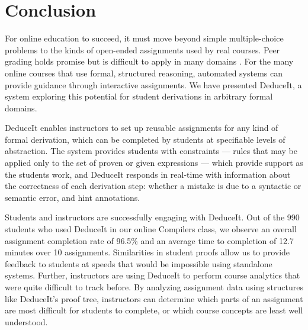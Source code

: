\documentclass{sigchi}
\begin{document}








\section{Conclusion}

For online education to succeed, it must move beyond simple multiple-choice problems to the kinds of open-ended assignments used by real courses. Peer grading holds promise but is difficult to apply in many domains \cite{peer-consistency}. For the many online courses that use formal, structured reasoning, automated systems can provide guidance through interactive assignments. We have presented DeduceIt, a system exploring this potential for student derivations in arbitrary formal domains. 

DeduceIt enables instructors to set up reusable assignments for any kind of formal derivation, which can be completed by students at specifiable levels of abstraction. The system provides students with constraints --- rules that may be applied only to the set of proven or given expressions --- which provide support as the students work, and DeduceIt responds in real-time with information about the correctness of each derivation step: whether a mistake is due to a syntactic or semantic error, and hint annotations.

Students and instructors are successfully engaging with DeduceIt. Out of the 990 students who used DeduceIt in our online Compilers class, we observe an overall assignment completion rate of 96.5\% and an average time to completion of 12.7 minutes over 10 assignments. Similarities in student proofs allow us to provide feedback to students at speeds that would be impossible using standalone systems. Further, instructors are using DeduceIt to perform course analytics that were quite difficult to track before. By analyzing assignment data using structures like DeduceIt's proof tree, instructors can determine which parts of an assignment are most difficult for students to complete, or which course concepts are least well understood.
\end{document}
